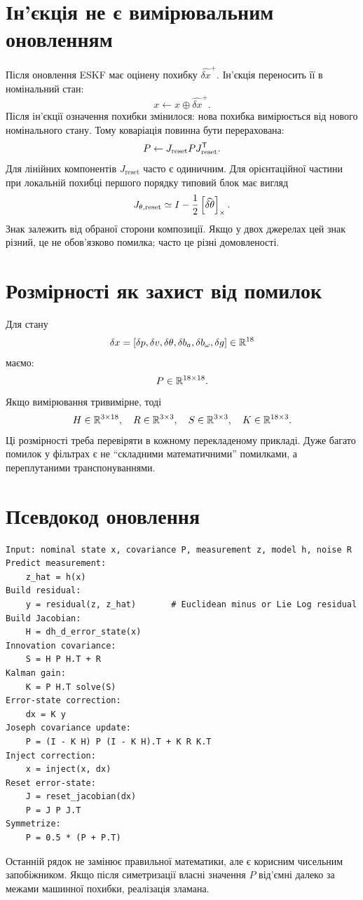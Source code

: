 \section{Ін'єкція не є вимірювальним оновленням}

Після оновлення ESKF має оцінену похибку $\widehat{\delta x}^{+}$. Ін'єкція переносить її в номінальний стан:
\[
x \leftarrow x\oplus\widehat{\delta x}^{+}.
\]
Після ін'єкції означення похибки змінилося: нова похибка вимірюється від нового номінального стану. Тому коваріація повинна бути перерахована:
\[
P \leftarrow J_{\mathrm{reset}}P J_{\mathrm{reset}}^{\mathsf{T}}.
\]
Для лінійних компонентів $J_{\mathrm{reset}}$ часто є одиничним. Для орієнтаційної частини при локальній похибці першого порядку типовий блок має вигляд
\[
J_{\theta,\mathrm{reset}}
\simeq I - \frac12\left[\widehat{\delta\theta}\right]_{\times}.
\]
Знак залежить від обраної сторони композиції. Якщо у двох джерелах цей знак різний, це не обов'язково помилка; часто це різні домовленості.

\section{Розмірності як захист від помилок}

Для стану
\[
\delta x =
[\delta p,\delta v,\delta\theta,\delta b_a,\delta b_\omega,\delta g]\in\mathbb{R}^{18}
\]
маємо:
\[
P\in\mathbb{R}^{18\times18}.
\]
Якщо вимірювання тривимірне, тоді
\[
H\in\mathbb{R}^{3\times18},\quad R\in\mathbb{R}^{3\times3},\quad S\in\mathbb{R}^{3\times3},\quad K\in\mathbb{R}^{18\times3}.
\]
Ці розмірності треба перевіряти в кожному перекладеному прикладі. Дуже багато помилок у фільтрах є не ``складними математичними'' помилками, а переплутаними транспонуваннями.

\section{Псевдокод оновлення}

\begin{lstlisting}
Input: nominal state x, covariance P, measurement z, model h, noise R
Predict measurement:
    z_hat = h(x)
Build residual:
    y = residual(z, z_hat)       # Euclidean minus or Lie Log residual
Build Jacobian:
    H = dh_d_error_state(x)
Innovation covariance:
    S = H P H.T + R
Kalman gain:
    K = P H.T solve(S)
Error-state correction:
    dx = K y
Joseph covariance update:
    P = (I - K H) P (I - K H).T + K R K.T
Inject correction:
    x = inject(x, dx)
Reset error-state:
    J = reset_jacobian(dx)
    P = J P J.T
Symmetrize:
    P = 0.5 * (P + P.T)
\end{lstlisting}

Останній рядок не замінює правильної математики, але є корисним чисельним запобіжником. Якщо після симетризації власні значення $P$ від'ємні далеко за межами машинної похибки, реалізація зламана.
